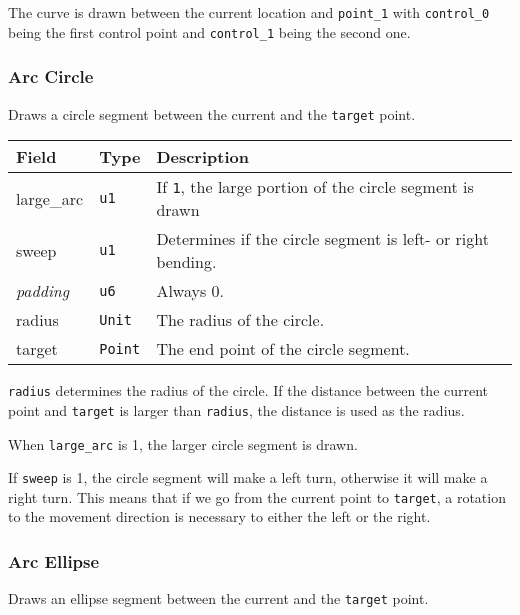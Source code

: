 \documentclass[]{article}
\begin{document}
The curve is drawn between the current location and \texttt{point\_1}
with \texttt{control\_0} being the first control point and
\texttt{control\_1} being the second one.

\hypertarget{arc-circle}{\subsubsection{Arc Circle}\label{arc-circle}}

Draws a circle segment between the current and the \texttt{target}
point.

\begin{longtable}[]{@{}p{1in}p{0.5in}p{4.5in}@{}}
\toprule
Field & Type & Description \\
\midrule
\endhead
large\_arc     & \texttt{u1}    & If \texttt{1}, the large portion of the circle segment is drawn \\
sweep          & \texttt{u1}    & Determines if the circle segment is left- or right bending. \\
\emph{padding} & \texttt{u6}    & Always 0. \\
radius         & \texttt{Unit}  & The radius of the circle. \\
target         & \texttt{Point} & The end point of the circle segment. \\
\bottomrule
\end{longtable}

\texttt{radius} determines the radius of the circle. If the distance
between the current point and \texttt{target} is larger than
\texttt{radius}, the distance is used as the radius.

When \texttt{large\_arc} is 1, the larger circle segment is drawn.

If \texttt{sweep} is 1, the circle segment will make a left turn,
otherwise it will make a right turn. This means that if we go from the
current point to \texttt{target}, a rotation to the movement direction
is necessary to either the left or the right.

\hypertarget{arc-ellipse}{\subsubsection{Arc Ellipse}\label{arc-ellipse}}

Draws an ellipse segment between the current and the \texttt{target}
point.
\end{document}

